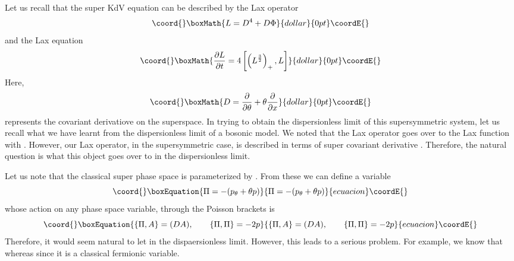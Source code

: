 \documentclass[a4paper,11pt]{article}
\begin{document}

Let us recall that the super KdV equation can be described by the Lax
operator
$$\coord{}\boxMath{
L = D^{4} + D \Phi
}{dollar}{0pt}\coordE{}$$
and the Lax equation
$$\coord{}\boxMath{
{\partial L\over \partial t} = 4 \left[\left(L^{3\over 2}\right)_{+} ,
L\right]
}{dollar}{0pt}\coordE{}$$
Here,
$$\coord{}\boxMath{
D = {\partial\over \partial \theta} + \theta {\partial\over \partial
x}
}{dollar}{0pt}\coordE{}$$ represents the covariant derivatiove on the superspace. In trying
to obtain the dispersionless limit of this supersymmetric system, let
us recall what we have learnt from the dispersionless limit of a
bosonic model. We noted that the Lax operator goes over to the Lax
function with \coordHE{}. However, our Lax operator, in
the supersymmetric case, is described in terms of super covariant
derivative \coordHE{}. Therefore, the natural question is what this object
goes over to in the dispersionless limit.

Let us note that the classical super phase space is parameterized by
\coordHE{} . From these we can define a variable
\begin{equation}\coord{}\boxEquation{
\Pi = - (p_{\theta} + \theta p)
}{
\Pi = - (p_{\theta} + \theta p)
}{ecuacion}\coordE{}\end{equation}
whose action on any phase space variable, through the Poisson brackets
is
\begin{equation}\coord{}\boxEquation{
\{\Pi , A\} = (DA),\qquad \{\Pi , \Pi\} = -2p
}{
\{\Pi , A\} = (DA),\qquad \{\Pi , \Pi\} = -2p
}{ecuacion}\coordE{}\end{equation}
Therefore, it would seem natural to let \coordHE{} in the
dispaersionless limit. However, this leads to a serious problem. For
example, we know that \coordHE{} whereas \coordHE{} since it is a classical fermionic variable.
\end{document}
